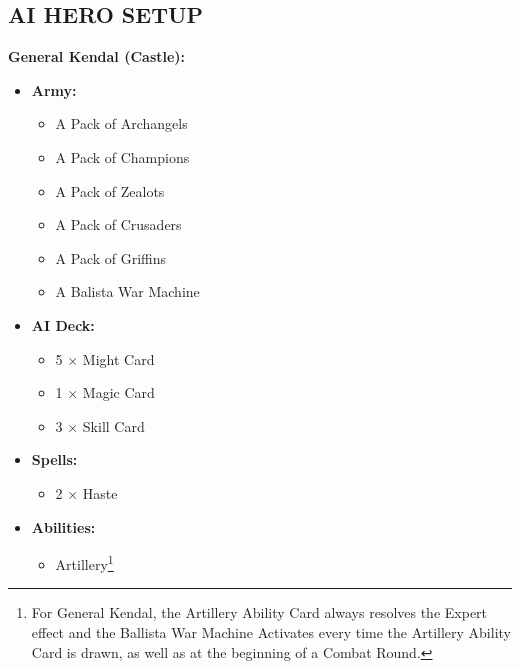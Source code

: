 \begin{multicols*}{2}
\subsection*{\MakeUppercase{AI Hero Setup}}

\textbf{General Kendal (Castle):}
\begin{itemize}
    \item \textbf{Army:}
    \begin{itemize}
        \item A Pack of Archangels
        \item A Pack of Champions
        \item A Pack of Zealots
        \item A Pack of Crusaders
        \item A Pack of Griffins
        \item A Balista War Machine
    \end{itemize}
    \item \textbf{AI Deck:}
    \begin{itemize}
        \item 5 × Might Card
        \item 1 × Magic Card
        \item 3 × Skill Card
    \end{itemize}
    \item \textbf{Spells:}
    \begin{itemize}
        \item 2 × Haste
    \end{itemize}
    \item \textbf{Abilities:}
    \begin{itemize}
        \item Artillery\footnote{For General Kendal, the Artillery Ability Card always resolves the Expert effect and the Ballista War Machine Activates every time the Artillery Ability Card is drawn, as well as at the beginning of a Combat Round.}
    \end{itemize}
\end{itemize}


\end{multicols*}
